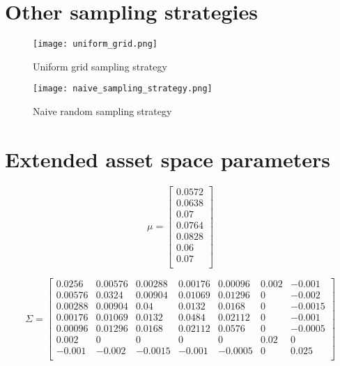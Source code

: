 \documentclass[11pt]{article}
\begin{document}
\fi

\begin{appendices}


\section{Other sampling strategies}\label{section: Appendix-sample}
\begin{figure}[h!]
  \begin{center}
  \caption{Uniform grid sampling strategy} 
  \label{fig: uniform_grid}
  \texttt{[image: uniform\_grid.png]}
  \end{center}
  \end{figure}

  \begin{figure}[h!]
    \begin{center}
    \caption{Naive random sampling strategy} 
    \label{fig: random_sample}
    \texttt{[image: naive\_sampling\_strategy.png]}
    \end{center}
    \end{figure}

\section{Extended asset space parameters}\label{section: Extended asset universe}

\[
\mu = 
\begin{bmatrix}
0.0572 \\
0.0638 \\
0.07 \\
0.0764 \\
0.0828 \\
0.06 \\
0.07 \\
\end{bmatrix}
\]

\[
\Sigma = 
\begin{bmatrix}
0.0256 & 0.00576 & 0.00288 & 0.00176 & 0.00096 & 0.002 & -0.001 \\
0.00576 & 0.0324 & 0.00904 & 0.01069 & 0.01296 & 0 & -0.002 \\
0.00288 & 0.00904 & 0.04 & 0.0132 & 0.0168 & 0 & -0.0015 \\
0.00176 & 0.01069 & 0.0132 & 0.0484 & 0.02112 & 0 & -0.001 \\
0.00096 & 0.01296 & 0.0168 & 0.02112 & 0.0576 & 0 & -0.0005 \\
0.002 & 0 & 0 & 0 & 0 & 0.02 & 0 \\
-0.001 & -0.002 & -0.0015 & -0.001 & -0.0005 & 0 & 0.025 \\
\end{bmatrix}
\]


\end{appendices}
\end{document}
